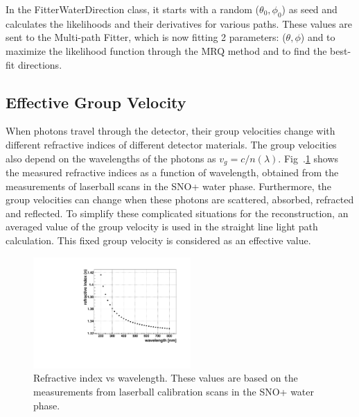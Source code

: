 In the FitterWaterDirection class, it starts with a random ($\theta_0,\phi_0$) as seed and calculates the likelihoods and their derivatives for various paths. These values are sent to the Multi-path Fitter, which is now fitting 2 parameters: ($\theta,\phi$) and to maximize the likelihood function through the MRQ method and to find the best-fit directions.

\subsection{Effective Group Velocity}\label{tuneGroupVelocity}
When photons travel through the detector, their group velocities change with different refractive indices of different detector materials. The group velocities also depend on the wavelengths of the photons as $v_g=c/n(\lambda)$. Fig~.\ref{nVsWavelength} shows the measured refractive indices as a function of wavelength, obtained from the measurements of laserball scans in the SNO+ water phase\cite{laserball_groupVelocity}. Furthermore, the group velocities can change when these photons are scattered, absorbed, refracted and reflected. To simplify these complicated situations for the reconstruction, an averaged value of the group velocity is used in the straight line light path calculation. This fixed group velocity is considered as an effective value.

\begin{figure}[!htb]
	\centering
	\includegraphics[width=6cm]{refractiveIndexVsWavelength.pdf}
	\caption{Refractive index vs wavelength. These values are based on the measurements from laserball calibration scans in the SNO+ water phase\cite{laserball_groupVelocity}.}
	\label{nVsWavelength}
\end{figure}

